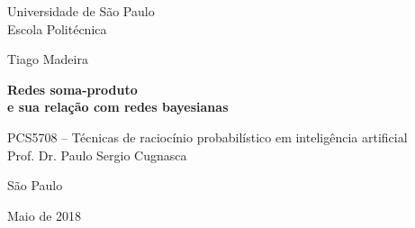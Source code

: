 \begin{center}
  \vspace*{1cm}
  Universidade de São Paulo\\
  Escola Politécnica

  \vspace*{3cm}
  {\Large Tiago Madeira}

  \vspace{3cm}
  {
    \Large \bfseries
    Redes soma-produto\\
    e sua relação com redes bayesianas
  }

  \vspace{3cm}
  PCS5708 -- Técnicas de raciocínio probabilístico em inteligência artificial\\
  Prof. Dr. Paulo Sergio Cugnasca

  \vspace{2cm}
  São Paulo

  Maio de 2018
\end{center}
